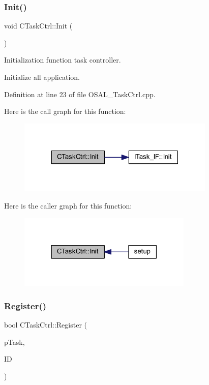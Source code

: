 \subsubsection{\texorpdfstring{Init()}{Init()}}
{\footnotesize\ttfamily void C\+Task\+Ctrl\+::\+Init (\begin{DoxyParamCaption}\item[{void}]{ }\end{DoxyParamCaption})}



Initialization function task controller. 

Initialize all application. 

Definition at line 23 of file O\+S\+A\+L\+\_\+\+Task\+Ctrl.\+cpp.

Here is the call graph for this function\+:
\nopagebreak
\begin{figure}[H]
\begin{center}
\leavevmode
\includegraphics[width=266pt]{class_c_task_ctrl_a12ec6e8d4a490eba9ebdf22d32cf292b_cgraph}
\end{center}
\end{figure}
Here is the caller graph for this function\+:
\nopagebreak
\begin{figure}[H]
\begin{center}
\leavevmode
\includegraphics[width=235pt]{class_c_task_ctrl_a12ec6e8d4a490eba9ebdf22d32cf292b_icgraph}
\end{center}
\end{figure}
\mbox{\label{class_c_task_ctrl_a20457bd4d4a033c8aeeb44e9d4dc3c7c}} 
\subsubsection{\texorpdfstring{Register()}{Register()}}
{\footnotesize\ttfamily bool C\+Task\+Ctrl\+::\+Register (\begin{DoxyParamCaption}\item[{\mbox{\hyperlink{class_i_task___i_f}{I\+Task\+\_\+\+IF}} $\ast$}]{p\+Task,  }\item[{\mbox{\hyperlink{_a_d_a_s___types_8h_aba7bc1797add20fe3efdf37ced1182c5}{uint8\+\_\+t}}}]{ID }\end{DoxyParamCaption})}



